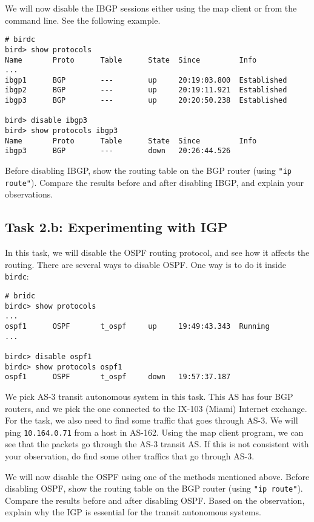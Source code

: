 We will now disable the IBGP sessions either using the map client or 
from the command line. See the following example.

\begin{lstlisting}
# birdc
bird> show protocols
Name       Proto      Table      State  Since         Info
...
ibgp1      BGP        ---        up     20:19:03.800  Established
ibgp2      BGP        ---        up     20:19:11.921  Established
ibgp3      BGP        ---        up     20:20:50.238  Established

bird> disable ibgp3 
bird> show protocols ibgp3
Name       Proto      Table      State  Since         Info
ibgp3      BGP        ---        down   20:26:44.526
\end{lstlisting}
 
Before disabling IBGP, show the routing table 
on the BGP router (using \texttt{"ip route"}). Compare the 
results before and after disabling IBGP, and explain
your observations. 


\subsection{Task 2.b: Experimenting with IGP} 

In this task, we will disable the OSPF routing protocol, and see 
how it affects the routing. There are several ways to disable
OSPF. One way is to do it inside \texttt{birdc}: 

\begin{lstlisting}
# bridc
birdc> show protocols
...
ospf1      OSPF       t_ospf     up     19:49:43.343  Running
...

birdc> disable ospf1
birdc> show protocols ospf1
ospf1      OSPF       t_ospf     down   19:57:37.187
\end{lstlisting}
 

We pick AS-3 transit autonomous system in this 
task. This AS has four BGP routers, and we pick the one 
connected to the IX-103 (Miami) Internet exchange.
For the task, we also need to find some traffic that 
goes through AS-3. 
We will ping \texttt{10.164.0.71} from a host in AS-162. Using the 
map client program, we can see that the packets go through
the AS-3 transit AS. If this is not consistent with your observation,
do find some other traffics that go through AS-3. 


We will now disable the OSPF using one of the methods mentioned above.
Before disabling OSPF, show the routing table 
on the BGP router (using \texttt{"ip route"}). Compare the 
results before and after disabling OSPF. Based on the 
observation, explain why the IGP is essential for the transit 
autonomous systems. 



